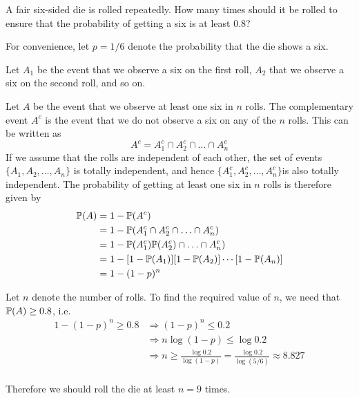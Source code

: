 
\begin{exercise}
\begin{questions}
\question
A fair six-sided die is rolled repeatedly. How many times should it be rolled to ensure that the probability of getting a six is at least 0.8?

\begin{answer}
For convenience, let $p=1/6$ denote the probability that the die shows a six.
\par
Let $A_1$ be the event that we observe a six on the first roll, $A_2$ that we observe a six on the second roll, and so on. 
\par
Let $A$ be the event that we observe at least one six in $n$ rolls. The complementary event $A^c$ is the event that we do not observe a six on any of the $n$ rolls. This can be written as
\[
A^c = A_1^c\cap A_2^c\cap\ldots\cap A_n^c
\]
If we assume that the rolls are independent of each other, the set of events $\{A_1,A_2,\ldots,A_n\}$ is totally independent, and hence $\{A_1^c,A_2^c,\ldots,A_n^c\}$is also totally independent. The probability of getting at least one six in $n$ rolls is therefore given by 
\begin{align*}
\mathbb{P}(A) 
	& = 1 - \mathbb{P}(A^c) \\
	& = 1 - \mathbb{P}(A_1^c\cap A_2^c\cap\ldots\cap A_n^c) \\
	& = 1 - \mathbb{P}(A_1^c)\mathbb{P}(A_2^c)\cap\ldots\cap A_n^c) \\
	& = 1 - [1-\mathbb{P}(A_1)][1-\mathbb{P}(A_2)]\cdots[1-\mathbb{P}(A_n)] \\
	& = 1 - (1-p)^n \\
\end{align*}

Let $n$ denote the number of rolls. To find the required value of $n$, we need that $\mathbb{P}(A)\geq 0.8$, i.e.\
\begin{align*}
1-(1-p)^n \geq 0.8	
	& \Rightarrow (1-p)^n \leq 0.2 \\
	& \Rightarrow n\log (1-p) \leq \log 0.2 \\
	& \Rightarrow n\geq \frac{\log 0.2}{\log(1-p)} = \frac{\log 0.2}{\log(5/6)} \approx 8.827 \\
\end{align*}

Therefore we should roll the die at least $n=9$ times.
\end{answer}


\end{questions}
\end{exercise}
